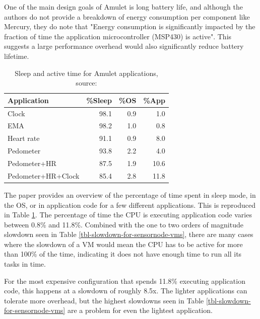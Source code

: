 One of the main design goals of Amulet is long battery life, and although the authors do not provide a breakdown of energy consumption per component like Mercury, they do note that "Energy consumption is significantly impacted by the fraction of time the application microcontroller (MSP430) is active". This suggests a large performance overhead would also significantly reduce battery lifetime.

\begin{table}
\caption[Sleep and active time for Amulet applications]{Sleep and active time for Amulet applications, source: \cite{Hester:2016je}}
\label{tbl-amulet-applications-sleep}
    \begin{tabular}{lrrr} %
        \toprule
        Application        & \%Sleep & \%OS & \%App \\
        \midrule
        \midrule
        Clock              & 98.1    & 0.9  & 1.0 \\
        EMA                & 98.2    & 1.0  & 0.8 \\
        Heart rate         & 91.1    & 0.9  & 8.0 \\
        Pedometer          & 93.8    & 2.2  & 4.0 \\
        Pedometer+HR       & 87.5    & 1.9  & 10.6 \\
        Pedometer+HR+Clock & 85.4    & 2.8  & 11.8 \\
        \bottomrule
    \end{tabular}
\end{table}

The paper provides an overview of the percentage of time spent in sleep mode, in the OS, or in application code for a few different applications. This is reproduced in Table \ref{tbl-amulet-applications-sleep}. The percentage of time the CPU is executing application code varies between 0.8\% and 11.8\%. Combined with the one to two orders of magnitude slowdown seen in Table \ref{tbl-slowdown-for-sensornode-vms}, there are many cases where the slowdown of a VM would mean the CPU has to be active for more than 100\% of the time, indicating it does not have enough time to run all its tasks in time.

For the most expensive configuration that spends 11.8\% executing application code, this happens at a slowdown of roughly 8.5x. The lighter applications can tolerate more overhead, but the highest slowdowns seen in Table \ref{tbl-slowdown-for-sensornode-vms} are a problem for even the lightest application.

